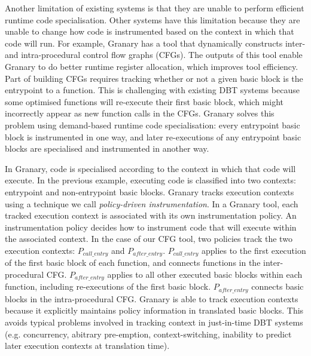 \documentclass[preprint]{sigplanconf}
\begin{document}
Another limitation of existing systems is that they are unable to perform efficient runtime code specialisation. Other systems have this limitation because they are unable to change how code is instrumented based on the context in which that code will run. For example, Granary has a tool that  dynamically constructs inter- and intra-procedural control flow graphs (CFGs). The outputs of this tool enable Granary to do better runtime register allocation, which improves tool efficiency. Part of building CFGs requires tracking whether or not a given basic block is the entrypoint to a function. This is challenging with existing DBT systems because some optimised functions will re-execute their first basic block, which might incorrectly appear as new function calls in the CFGs. Granary solves this problem using demand-based runtime code specialisation: every entrypoint basic block is instrumented in one way, and later re-executions of any entrypoint basic blocks are specialised and instrumented in another way.


In Granary, code is specialised according to the context in which that code will execute. In the previous example, executing code is classified into two contexts: entrypoint and non-entrypoint basic blocks. Granary tracks execution contexts using a technique we call \emph{policy-driven instrumentation}. In a Granary tool, each tracked execution context is associated with its own instrumentation policy. An instrumentation policy decides how to instrument code that will execute within the associated context. In the case of our CFG tool, two policies track the two execution contexts: $P_{call\_entry}$ and $P_{after\_entry}$. $P_{call\_entry}$ applies to the first execution of the first basic block of each function, and connects functions in the inter-procedural CFG.  $P_{after\_entry}$ applies to all other executed basic blocks within each function, including re-executions of the first basic block. $P_{after\_entry}$ connects basic blocks in the intra-procedural CFG. Granary is able to track execution contexts because it explicitly maintains policy information in translated basic blocks. This avoids typical problems involved in tracking context in just-in-time DBT systems (e.g. concurrency, abitrary pre-emption, context-switching, inability to predict later execution contexts at translation time).
\end{document}
